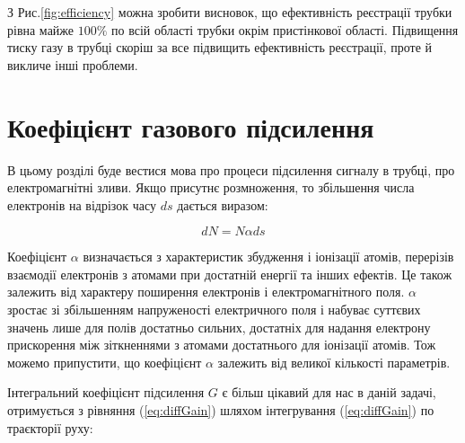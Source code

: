 \documentclass[pdftex,14pt]{scrartcl}
\begin{document}
	З Рис.\ref{fig:efficiency}  можна зробити висновок, що ефективність реєстрації трубки рівна майже $100\%$  по всій області трубки окрім пристінкової області. Підвищення тиску газу в трубці скоріш за все підвищить ефективність реєстрації, проте й викличе інші проблеми.
	
	
		 
	\section{ Коефіцієнт газового підсилення}
	
	В цьому розділі буде вестися мова про процеси підсилення сигналу в трубці, про електромагнітні зливи. Якщо присутнє розмноження, то збільшення числа електронів на відрізок часу $ds$ дається виразом:
	
	
	\begin{equation}
		dN = N \alpha ds
		\label{eq:diffGain}
	\end{equation}

	Коефіцієнт $\alpha$  визначається з характеристик збудження і іонізації атомів, перерізів взаємодії електронів з атомами при достатній енергії та інших ефектів. Це також залежить від характеру поширення електронів і електромагнітного поля. $\alpha$ зростає зі збільшенням напруженості електричного поля і набуває суттєвих значень лише для полів достатньо сильних, достатніх для надання електрону прискорення між зіткненнями  з атомами достатнього для іонізації атомів. Тож можемо припустити, що коефіцієнт $\alpha$  залежить від великої кількості параметрів.
	
	Інтегральний коефіцієнт  підсилення $G$ є більш цікавий для нас в даній задачі, отримується з рівняння (\ref{eq:diffGain}) шляхом інтегрування (\ref{eq:diffGain}) по траєкторії руху:
	
	
\end{document}
